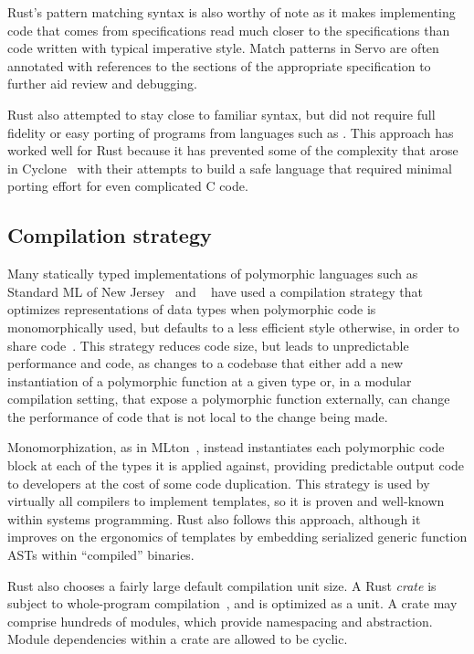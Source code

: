 Rust's pattern matching syntax is also worthy of note as it makes implementing
code that comes from specifications read much closer to the specifications
than code written with typical imperative style. Match patterns in Servo are
often annotated with references to the sections of the appropriate
specification to further aid review and debugging.

Rust also attempted to stay close to familiar syntax, but did not require full fidelity or easy porting of
programs from languages such as \Cplusplus{}.
This approach has worked well for Rust because it has prevented some of the complexity that arose in
Cyclone~\cite{cyclone} with their attempts to build a safe language that required minimal porting effort
for even complicated C code.

\subsection{Compilation strategy}
Many statically typed implementations of polymorphic languages such as Standard ML of New Jersey~\cite{SMLNJ} and
\ocaml{}~\cite{ocaml-manual-3.0} have used a compilation strategy that optimizes representations of data types when
polymorphic code is monomorphically used, but defaults to a less efficient style otherwise, in order to share
code~\cite{ocaml-repr}.
This strategy reduces code size, but leads to unpredictable performance and code, as changes to a codebase that
either add a new instantiation of a polymorphic function at a given type or, in a modular compilation setting, that
expose a polymorphic function externally, can change the performance of code that is not local to the change being
made.

Monomorphization, as in MLton~\cite{mlton-compiler}, instead instantiates each polymorphic code block at each of the types
it is applied against, providing predictable output code to developers at the cost of some code duplication.
This strategy is used by virtually all \Cplusplus{} compilers to implement templates, so it is proven and well-known
within systems programming.
Rust also follows this approach, although it improves on the ergonomics of \Cplusplus{} templates
by embedding serialized generic function ASTs within ``compiled'' binaries.

Rust also chooses a fairly large default compilation unit size. A Rust \textit{crate} is subject to whole-program
compilation~\cite{weeks:whole-program-mlton}, and is optimized as a unit. A crate may comprise hundreds of modules,
which provide namespacing and abstraction. Module dependencies within a crate are allowed to be cyclic.

